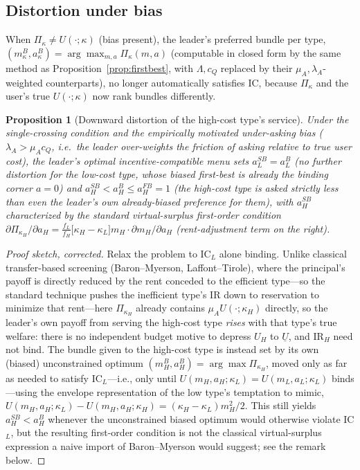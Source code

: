 \documentclass[11pt]{article}
\newtheorem{proposition}{Proposition}
\begin{document}
\subsection{Distortion under bias}

When $\Pi_\kappa \ne U(\cdot;\kappa)$ (bias present), the leader's preferred bundle
per type, $(m_\kappa^{B},a_\kappa^{B})=\arg\max_{m,a}\Pi_\kappa(m,a)$ (computable
in closed form by the same method as Proposition~\ref{prop:firstbest}, with
$\Lambda,c_Q$ replaced by their $\mu_A,\lambda_A$-weighted counterparts), no longer
automatically satisfies IC, because $\Pi_\kappa$ and the user's true $U(\cdot;\kappa)$
now rank bundles differently.

\begin{proposition}[Downward distortion of the high-cost type's service]
\label{prop:distortion}
Under the single-crossing condition and the empirically motivated under-asking
bias ($\lambda_A > \mu_A c_Q$, i.e.\ the leader over-weights the friction of
asking relative to true user cost), the leader's optimal incentive-compatible
menu sets $a_L^{SB}=a_L^{B}$ (no further distortion for the low-cost type, whose
biased first-best is already the binding corner $a=0$) and $a_H^{SB} < a_H^{B} \le
a_H^{FB}=1$ (the high-cost type is asked strictly less than even the leader's own
already-biased preference for them), with $a_H^{SB}$ characterized by the
standard virtual-surplus first-order condition
$\partial\Pi_{\kappa_H}/\partial a_H = \frac{f_L}{f_H}\big[\kappa_H-\kappa_L\big]
m_H \cdot \partial m_H/\partial a_H$ (rent-adjustment term on the right).
\end{proposition}

\begin{proof}[Proof sketch, corrected]
Relax the problem to IC$_L$ alone binding. Unlike classical transfer-based
screening (Baron--Myerson, Laffont--Tirole), where the principal's payoff is
directly reduced by the rent conceded to the efficient type---so the standard
technique pushes the inefficient type's IR down to reservation to minimize that
rent---here $\Pi_{\kappa_H}$ already contains $\mu_A U(\cdot;\kappa_H)$ directly,
so the leader's own payoff from serving the high-cost type \emph{rises} with
that type's true welfare: there is no independent budget motive to depress
$U_H$ to $\underline{U}$, and IR$_H$ need not bind. The bundle given to the
high-cost type is instead set by its own (biased) unconstrained optimum
$(m_H^{B},a_H^{B})=\arg\max\Pi_{\kappa_H}$, moved only as far as needed to
satisfy IC$_L$---i.e., only until $U(m_H,a_H;\kappa_L)=U(m_L,a_L;\kappa_L)$
binds---using the envelope representation of the low type's temptation to
mimic, $U(m_H,a_H;\kappa_L)-U(m_H,a_H;\kappa_H)=(\kappa_H-\kappa_L)m_H^2/2$.
This still yields $a_H^{SB}<a_H^{B}$ whenever the unconstrained biased optimum
would otherwise violate IC$_L$, but the resulting first-order condition is not
the classical virtual-surplus expression a naive import of Baron--Myerson would
suggest; see the remark below.
\end{proof}
\end{document}
